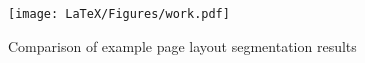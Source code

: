 \documentclass[letterpaper]{article} %
\begin{document}





\begin{figure}[h]
   \centering
   \texttt{[image: LaTeX/Figures/work.pdf]}
   \caption{Comparison of example page layout segmentation results}
   \label{fig:all_vis}
 \end{figure}
\end{document}
